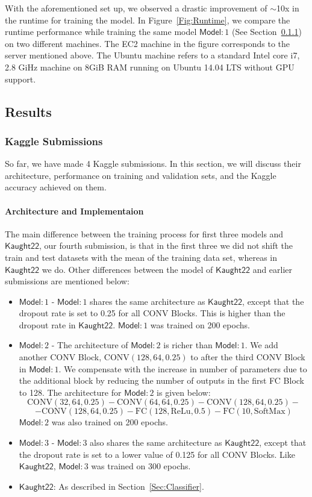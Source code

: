 \documentclass[]{article}
\newcommand*{\K}{\ensuremath{\mathsf{Kaught22}}}
\newcommand*{\Model}[1]{\ensuremath{\mathsf{Model}}:#1}
\begin{document}
With the aforementioned set up, we observed a  drastic improvement of $\sim$10x in the runtime for training the model. In Figure~\ref{Fig:Runtime}, we compare the runtime performance while training the same model $\Model{1}$ (See Section~\ref{Sec:KaggleSub}) on two different machines. The EC2 machine in the figure corresponds to the server mentioned above. The Ubuntu machine refers to a standard Intel core i7, 2.8 GiHz machine on 8GiB RAM running on Ubuntu 14.04 LTS without GPU support. 






\subsection{Results}
\label{Sec:Results}
\subsubsection{Kaggle Submissions}
\label{Sec:KaggleSub}
So far, we have made 4 Kaggle submissions. In this section, we will discuss their architecture, performance on training and validation sets, and the Kaggle accuracy achieved on them. 

\paragraph{Architecture and Implementaion}
The main difference between the training process for first three models and $\K$, our fourth submission, is that in the first three we did not shift the train and test datasets with the mean of the training data set, whereas in $\K$ we do. Other differences between the model of $\K$ and earlier submissions are mentioned below:
\begin{itemize}
\item $\Model{1}$ - $\Model{1}$ shares the same architecture as $\K$, except that the dropout rate is set to 0.25 for all CONV Blocks. This is higher than the dropout rate in $\K$. $\Model{1}$ was trained on 200 epochs.
 
\item $\Model{2}$ - The architecture of $\Model{2}$ is richer than $\Model{1}$. We add another CONV Block, CONV$(128, 64, 0.25)$ to after the third CONV Block in $\Model{1}$. We compensate with the increase in number of parameters due to the additional block by reducing the number of outputs in the first FC Block to 128. The architecture for $\Model{2}$ is given below:
\[
\text{CONV}(32, 64, 0.25)-\text{CONV}(64, 64, 0.25) - \text{CONV}(128, 64, 0.25) -\]
\[ - \text{CONV}(128, 64, 0.25) - \text{FC}(128, \text{ReLu}, 0.5) - \text{FC}(10, \text{SoftMax})
\]
$\Model{2}$ was also trained on 200 epochs. 

\item $\Model{3}$ - $\Model{3}$ also shares the same architecture as $\K$, except that the dropout rate is set to a lower value of 0.125 for all CONV Blocks. Like $\K$,  $\Model{3}$ was trained on 300 epochs. 
\item $\K$: As described in Section~\ref{Sec:Classifier}.
\end{itemize} 
\end{document}
